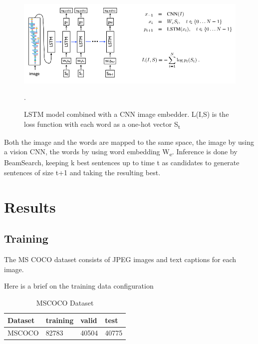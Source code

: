 \begin{figure}[ht!]
\centering
\includegraphics[width=1\textwidth]{assets/model.png}
\caption{\label{fig:model}LSTM model combined with a CNN image embedder. L(I,S) is the loss function with each word as a one-hot vector S\textsubscript{t}}.
\end{figure}

Both the image and the words are mapped to the same space, the image by using a vision CNN, the words by using word embedding W\textsubscript{e}. Inference is done by BeamSearch, keeping k best sentences up to time t as candidates to generate sentences of size t+1 and taking the resulting best.

\section{Results}
\label{sec:results}

\subsection{Training}
The MS COCO dataset consists of JPEG images and text captions for each image.



Here is a brief on the training data configuration
\begin{table}[ht!]
\centering
  \begin{tabular}{l|l|l|l}
    Dataset & training & valid & test  \\\hline
    MSCOCO & 82783 & 40504 & 40775\\
  \end{tabular}
\caption{\label{tab:dataset} MSCOCO Dataset}
\label{tab:dataset}
\end{table}

